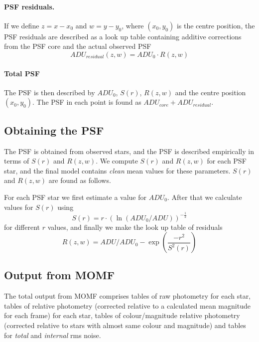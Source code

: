 \documentclass[]{article}
\begin{document}
\paragraph{PSF residuals.}
If we define $z = x - x_{0}$ and $w = y - y_{0}$, where $(x_{0} , 
y_{0})$
is the centre position, the PSF residuals are described as a
look up table containing additive corrections from the
PSF core and the actual observed PSF
\begin{equation}
ADU_{residual} (z,w) = ADU_{0} \cdot R(z,w)
\end{equation}
\paragraph{Total PSF}
The PSF is then described by $ADU_{0}$, $S(r)$,  $R(z,w)$ and the
centre position $(x_{0} , y_{0})$. The PSF in
each point is found as $ADU_{core} + ADU_{residual}$.

\subsection{Obtaining the PSF}
The PSF is obtained from observed stars, and the PSF is
described empirically in terms of $S(r)$ and $R(z,w)$.
We compute $S(r)$ and $R(z,w)$ for each PSF star, and the final
model contains {\em clean} mean values for these parameters.
$S(r)$ and $R(z,w)$ are found as follows.

For each PSF star we first estimate a value for $ADU_{0}$. After that
we calculate values for $S(r)$ using
\begin{equation}
S(r) =  r \cdot ( \ln ( ADU_{0} / ADU ) )^{- \frac{1}{2} } 
\end{equation}
for different $r$ values,
and finally we make the look up table of residuals
\begin{equation}
R(z,w) = ADU / ADU_{0} - \exp ( \frac {-r ^{2} }{S^{2} (r) } )
\end{equation}
 
\subsection{Output from MOMF}
The total output from MOMF comprises tables of raw photometry for 
each
star, tables of relative photometry (corrected relative to a
calculated mean magnitude for each frame) for each star, tables of 
colour/magnitude relative photometry (corrected relative
to stars with almost same colour and magnitude) and tables
for {\em total} and {\em internal} rms noise.
 
\end{document}
